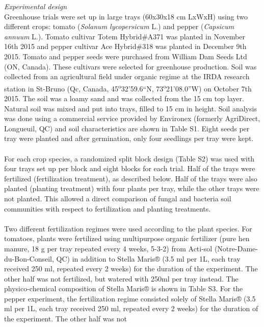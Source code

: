 \documentclass[12pt,]{article}
\begin{document}
\emph{Experimental design}\\
Greenhouse trials were set up in large trays (60x30x18 cm LxWxH) using
two different crops: tomato (\emph{Solanum lycopersicum} L.) and pepper
(\emph{Capsicum annuum} L.). Tomato cultivar Totem Hybrid\#A371 was
planted in November 16th 2015 and pepper cultivar Ace Hybrid\#318 was
planted in December 9th 2015. Tomato and pepper seeds were purchased
from William Dam Seeds Ltd (ON, Canada). These cultivars were selected
for greenhouse production. Soil was collected from an agricultural field
under organic regime at the IRDA research station in St-Bruno (Qc,
Canada, 45\textsuperscript{o}32'59.6``N,
73\textsuperscript{o}21'08.0''W) on October 7th 2015. The soil was a
loamy sand and was collected from the 15 cm top layer. Natural soil was
mixed and put into trays, filled to 15 cm in height. Soil analysis was
done using a commercial service provided by Environex (formerly
AgriDirect, Longueuil, QC) and soil characteristics are shown in Table
S1. Eight seeds per tray were planted and after germination, only four
seedlings per tray were kept.\\
\hspace*{0.333em}\\
For each crop species, a randomized split block design (Table S2) was
used with four trays set up per block and eight blocks for each trial.
Half of the trays were fertilized (fertilization treatment), as
described below. Half of the trays were also planted (planting
treatment) with four plants per tray, while the other trays were not
planted. This allowed a direct comparison of fungal and bacteria soil
communities with respect to fertilization and planting treatments.\\
\hspace*{0.333em}\\
Two different fertilization regimes were used according to the plant
species. For tomatoes, plants were fertilized using multipurpose organic
fertilizer (pure hen manure, 18 g per tray repeated every 4 weeks,
5-3-2) from Acti-sol (Notre-Dame-du-Bon-Conseil, QC) in addition to
Stella Maris® (3.5 ml per 1L, each tray received 250 ml, repeated every
2 weeks) for the duration of the experiment. The other half was not
fertilized, but watered with 250ml per tray instead. The
physico-chemical composition of Stella Maris® is shown in Table S3. For
the pepper experiment, the fertilization regime consisted solely of
Stella Maris® (3.5 ml per 1L, each tray received 250 ml, repeated every
2 weeks) for the duration of the experiment. The other half was not
\end{document}
